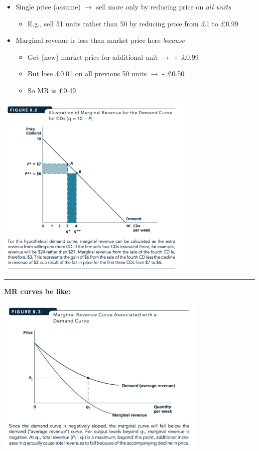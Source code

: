 \documentclass[]{article}
\providecommand{\tightlist}{%
  \setlength{\itemsep}{0pt}\setlength{\parskip}{0pt}}
\begin{document}
\begin{itemize}
\tightlist
\item
  Single price (assume) \(\rightarrow\) sell more only by reducing price
  on \emph{all units}

  \begin{itemize}
  \tightlist
  \item
    E.g., sell 51 units rather than 50 by reducing price from £1 to
    £0.99
  \end{itemize}
\item
  Marginal revenue is less than market price here \emph{because}

  \begin{itemize}
  \tightlist
  \item
    Get (new) market price for additional unit \(\rightarrow\) + £0.99
  \item
    But lose £0.01 on all previous 50 units \(\rightarrow\) - £0.50
  \item
    So MR is £0.49
  \end{itemize}
\end{itemize}

\includegraphics[height=3.5in]{picsfigs/Mrillustrated.png}

\begin{center}\rule{0.5\linewidth}{\linethickness}\end{center}

\textbf{MR curves be like:}

\includegraphics[height=3in]{picsfigs/mrcurve.png}
\end{document}
